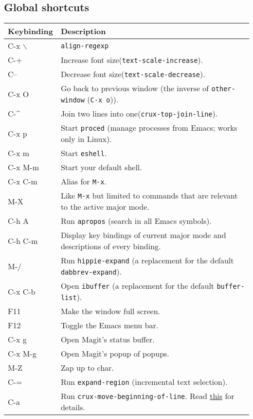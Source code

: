 \documentclass[11pt]{article}
\begin{document}
\subsection{Global shortcuts}
\label{sec:org4442866}
\begin{center}
\begin{tabular}{ll}
Keybinding & Description\\
\hline
C-x $\backslash$ & \texttt{align-regexp}\\
C-+ & Increase font size(\texttt{text-scale-increase}).\\
C-- & Decrease font size(\texttt{text-scale-decrease}).\\
C-x O & Go back to previous window (the inverse of \texttt{other-window} (\texttt{C-x o})).\\
C-\^{} & Join two lines into one(\texttt{crux-top-join-line}).\\
C-x p & Start \texttt{proced} (manage processes from Emacs; works only in Linux).\\
C-x m & Start \texttt{eshell}.\\
C-x M-m & Start your default shell.\\
C-x C-m & Alias for \texttt{M-x}.\\
M-X & Like \texttt{M-x} but limited to commands that are relevant to the active major mode.\\
C-h A & Run \texttt{apropos} (search in all Emacs symbols).\\
C-h C-m & Display key bindings of current major mode and descriptions of every binding.\\
M-/ & Run \texttt{hippie-expand} (a replacement for the default \texttt{dabbrev-expand}).\\
C-x C-b & Open \texttt{ibuffer} (a replacement for the default \texttt{buffer-list}).\\
F11 & Make the window full screen.\\
F12 & Toggle the Emacs menu bar.\\
C-x g & Open Magit's status buffer.\\
C-x M-g & Open Magit's popup of popups.\\
M-Z & Zap up to char.\\
C-= & Run \texttt{expand-region} (incremental text selection).\\
C-a & Run \texttt{crux-move-beginning-of-line}. Read \href{http://emacsredux.com/blog/2013/05/22/smarter-navigation-to-the-beginning-of-a-line/}{this} for details.\\
\end{tabular}
\end{center}
\end{document}
